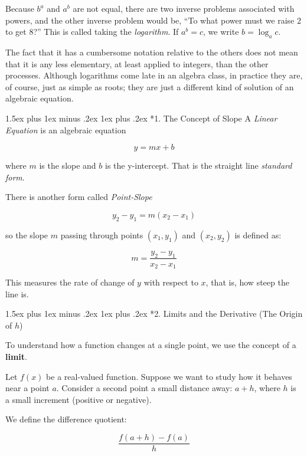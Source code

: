 \documentclass[10pt,twocolumn]{article}
\makeatletter
\renewcommand\section{%
  \@startsection{section}{1}{0pt}%
  {1.5ex plus 1ex minus .2ex}%
  {1ex plus .2ex}%
  {\normalfont\normalsize\bfseries}} %
\makeatother
\begin{document}
Because \( b^a \) and \( a^b \) are not equal, there are two inverse problems associated with powers, and the other inverse problem would be, ``To what power must we raise 2 to get 8?'' This is called taking the \textit{logarithm}. If \( a^b = c \), we write \( b = \log_{a} c \).

The fact that it has a cumbersome notation relative to the others does not mean that it is any less elementary, at least applied to integers, than the other processes. Although logarithms come late in an algebra class, in practice they are, of course, just as simple as roots; they are just a different kind of solution of an algebraic equation.

\section*{1. The Concept of Slope}
A \textit{Linear Equation} is an algebraic equation

\[
y = mx + b
\]

where \( m \) is the slope and \( b \) is the y-intercept. That is the straight line \textit{standard form}.

There is another form called \textit{Point-Slope}

\[
y_2 - y_1 = m(x_2 - x_1)
\]

so the slope \( m \) passing through points \((x_1, y_1)\) and \((x_2, y_2)\) is defined as:

\begin{equation}
m = \frac{y_2 - y_1}{x_2 - x_1}
\end{equation}

This measures the rate of change of \(y\) with respect to \(x\), that is, how steep the line is.

\section*{2. Limits and the Derivative (The Origin of \( h \))}

To understand how a function changes at a single point, we use the concept of a \textbf{limit}.

Let \( f(x) \) be a real-valued function. Suppose we want to study how it behaves near a point \( a \). Consider a second point a small distance away: \( a + h \), where \( h \) is a small increment (positive or negative).

We define the difference quotient:

\[
\frac{f(a + h) - f(a)}{h}
\]
\end{document}
